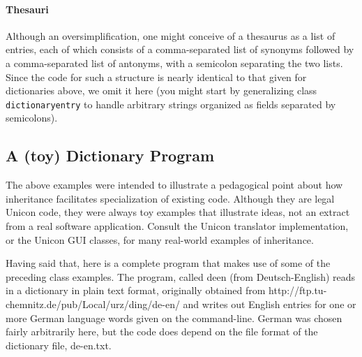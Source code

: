 \paragraph{Thesauri}
Although an oversimplification, one might conceive of a thesaurus as a
list of entries, each of which consists of a comma-separated list of
synonyms followed by a comma-separated list of antonyms, with a
semicolon separating the two lists. Since the code for such a structure
is nearly identical to that given for dictionaries above, we omit it
here (you might start by generalizing class \texttt{dictionaryentry} to
handle arbitrary strings organized as fields separated by semicolons). 


\subsection*{A (toy) Dictionary Program}

The above examples were intended to illustrate a pedagogical point
about how inheritance facilitates specialization of existing code.
Although they are legal Unicon code, they were always toy examples
that illustrate ideas, not an extract from a real software
application.  Consult the Unicon translator implementation, or
the Unicon GUI classes, for many real-world examples of inheritance.

Having said that, here is a complete program that makes use of some
of the preceding class examples.  The program, called deen (from
Deutsch-English) reads in a dictionary in plain text format,
originally obtained from
http://ftp.tu-chemnitz.de/pub/Local/urz/ding/de-en/
and writes out English entries for one or more German language words
given on the command-line. German was chosen fairly arbitrarily here,
but the code does depend on the file format of the dictionary file,
de-en.txt.

